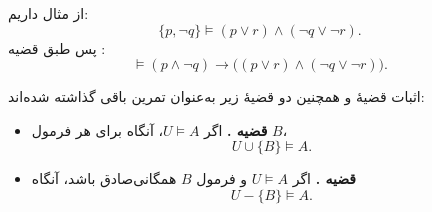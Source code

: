     \begin{example}[مثال \lr{2.52}]
      از مثال  داریم:
      \[
      \{p, \neg q\} \models (p \lor r) \land (\neg q \lor \neg r).
      \]
      پس طبق قضیه :
      \[
      \models (p \land \neg q) \to \bigl((p \lor r) \land (\neg q \lor \neg r)\bigr).
      \]
    \end{example}
    
    اثبات قضیهٔ  و همچنین دو قضیهٔ زیر به‌عنوان تمرین باقی گذاشته شده‌اند:
    
    \begin{itemize}
      \item \textbf{قضیه .} اگر $U \models A$، آنگاه برای هر فرمول $B$،
      \[
      U \cup \{B\} \models A.
      \]
    
      \item \textbf{قضیه .} اگر $U \models A$ و فرمول $B$ همگانی‌صادق باشد، آنگاه
      \[
      U - \{B\} \models A.
      \]
    \end{itemize}
